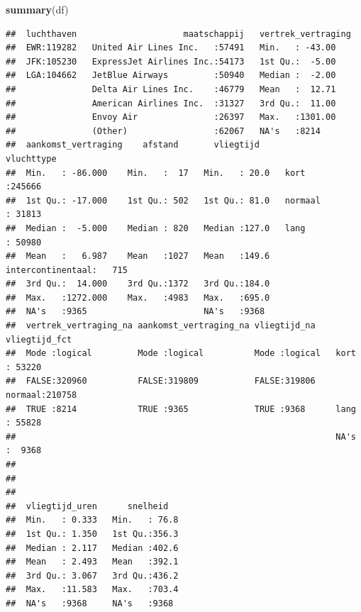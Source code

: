\documentclass[]{tufte-book}
\newenvironment{Shaded}{}{}
\newcommand{\KeywordTok}[1]{\textcolor[rgb]{0.00,0.44,0.13}{\textbf{#1}}}
\newcommand{\NormalTok}[1]{#1}
\begin{document}
\begin{Shaded}
\begin{Highlighting}[]
\KeywordTok{summary}\NormalTok{(df)}
\end{Highlighting}
\end{Shaded}

\begin{verbatim}
##  luchthaven                     maatschappij   vertrek_vertraging
##  EWR:119282   United Air Lines Inc.   :57491   Min.   : -43.00   
##  JFK:105230   ExpressJet Airlines Inc.:54173   1st Qu.:  -5.00   
##  LGA:104662   JetBlue Airways         :50940   Median :  -2.00   
##               Delta Air Lines Inc.    :46779   Mean   :  12.71   
##               American Airlines Inc.  :31327   3rd Qu.:  11.00   
##               Envoy Air               :26397   Max.   :1301.00   
##               (Other)                 :62067   NA's   :8214      
##  aankomst_vertraging    afstand       vliegtijd                 vluchttype    
##  Min.   : -86.000    Min.   :  17   Min.   : 20.0   kort             :245666  
##  1st Qu.: -17.000    1st Qu.: 502   1st Qu.: 81.0   normaal          : 31813  
##  Median :  -5.000    Median : 820   Median :127.0   lang             : 50980  
##  Mean   :   6.987    Mean   :1027   Mean   :149.6   intercontinentaal:   715  
##  3rd Qu.:  14.000    3rd Qu.:1372   3rd Qu.:184.0                             
##  Max.   :1272.000    Max.   :4983   Max.   :695.0                             
##  NA's   :9365                       NA's   :9368                              
##  vertrek_vertraging_na aankomst_vertraging_na vliegtijd_na    vliegtijd_fct   
##  Mode :logical         Mode :logical          Mode :logical   kort   : 53220  
##  FALSE:320960          FALSE:319809           FALSE:319806    normaal:210758  
##  TRUE :8214            TRUE :9365             TRUE :9368      lang   : 55828  
##                                                               NA's   :  9368  
##                                                                               
##                                                                               
##                                                                               
##  vliegtijd_uren      snelheid    
##  Min.   : 0.333   Min.   : 76.8  
##  1st Qu.: 1.350   1st Qu.:356.3  
##  Median : 2.117   Median :402.6  
##  Mean   : 2.493   Mean   :392.1  
##  3rd Qu.: 3.067   3rd Qu.:436.2  
##  Max.   :11.583   Max.   :703.4  
##  NA's   :9368     NA's   :9368
\end{verbatim}
\end{document}
